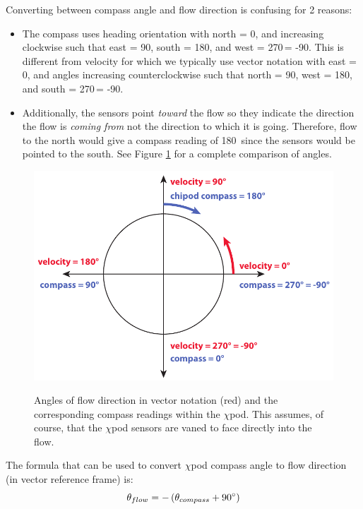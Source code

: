 \documentclass[12pt]{article}
\begin{document}
Converting between compass angle and flow direction is confusing for 2 reasons:

\begin{itemize}
\item The compass uses heading orientation with north = 0\degree, and increasing clockwise such that east = 90\degree, south = 180\degree, and west = 270\degree \,= -90\degree. This is different from velocity for which we typically use vector notation with east = 0\degree, and angles increasing counterclockwise such that north = 90\degree, west = 180\degree, and south = 270\degree \,= -90\degree.
\item Additionally, the sensors point \textit{toward} the flow so they indicate the direction the flow is \textit{coming from} not the direction to which it is going. Therefore, flow to the north would give a compass reading of 180\degree \, since the sensors would be pointed to the south. See Figure \ref{fig:cmpvelangles} for a complete comparison of angles.
\end{itemize}


\begin{figure}[h]
  \centering \centering\noindent\includegraphics[width=12cm,angle=0]{./figs/compass_and_velocity_angles.pdf}\\
    \caption{Angles of flow direction in vector notation (red) and the corresponding compass readings within the $\chi$pod. This assumes, of course, that the $\chi$pod sensors are vaned to face directly into the flow.}\label{fig:cmpvelangles}
\end{figure}

The formula that can be used to convert $\chi$pod compass angle to flow direction (in vector reference frame) is:
\begin{equation}
\theta_{flow} = -\left(\theta_{compass} + 90\degree\right)
\end{equation}
\end{document}
